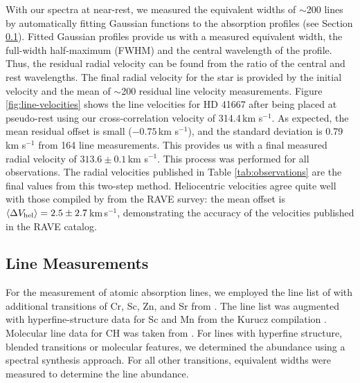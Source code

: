 \documentclass{emulateapj}
\begin{document}
With our spectra at near-rest, we measured the equivalent widths of $\sim$200 lines by automatically fitting Gaussian functions to the absorption profiles (see Section \ref{sec:line-measurements}). Fitted Gaussian profiles provide us with a measured equivalent width, the full-width half-maximum (FWHM) and the central wavelength of the profile. Thus, the residual radial velocity can be found from the ratio of the central and rest wavelengths. The final radial velocity for the star is provided by the initial velocity and the mean of $\sim$200 residual line velocity measurements. Figure \ref{fig:line-velocities} shows the line velocities for HD 41667 after being placed at pseudo-rest using our cross-correlation velocity of 314.4\,km s$^{-1}$. As expected, the mean residual offset is small ($-0.75$\,km s$^{-1}$), and the standard deviation is 0.79\,km s$^{-1}$ from 164 line measurements. This provides us with a final measured radial velocity of $313.6 \pm 0.1$\,km s$^{-1}$. This process was performed for all observations. The radial velocities published in Table \ref{tab:observations} are the final values from this two-step method. Heliocentric velocities agree quite well with those compiled by \citet{williams;et-al_2011} from the RAVE survey: the mean offset is $\langle\Delta{V_{\rm hel}}\rangle = 2.5 \pm 2.7$\,km\,s$^{-1}$, demonstrating the accuracy of the velocities published in the RAVE catalog.




\subsection{Line Measurements}
\label{sec:line-measurements}

For the measurement of atomic absorption lines, we employed the line list of \citet{yong;et-al_2005} with additional transitions of Cr, Sc, Zn, and Sr from \citet{frebel;et-al_2010}. The line list was augmented with hyperfine-structure data for Sc and Mn from the Kurucz compilation \citet{kurucz;1998}. Molecular line data for CH was taken from \citet{plez;et-al_2008,plez;et-al_2009}. For lines with hyperfine structure, blended transitions or molecular features, we determined the abundance using a spectral synthesis approach. For all other transitions, equivalent widths were measured to determine the line abundance.
\end{document}
